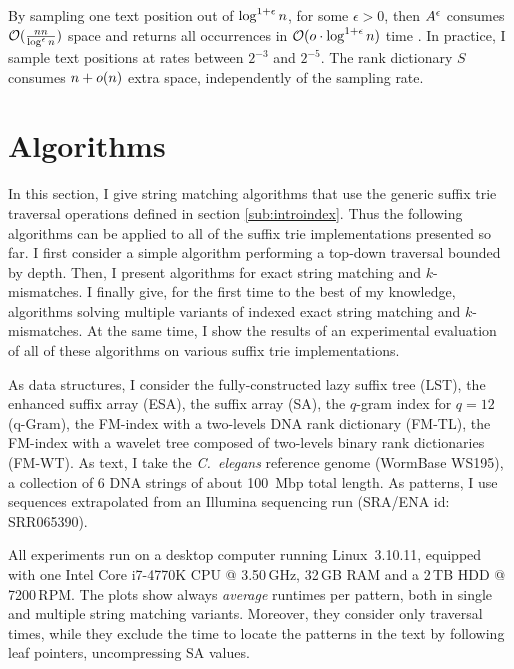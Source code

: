 By sampling one text position out of $\log^{1+\epsilon}{n}$, for some $\epsilon > 0$, then $A^{\epsilon}$ consumes $\mathcal{O}(\frac{n{n}}{\log^{\epsilon}{n}})$ space and  returns all occurrences in $\mathcal{O}(o \cdot \log^{1+\epsilon}{n})$ time \citep{Ferragina2000}.
In practice, I sample text positions at rates between $2^{-3}$ and $2^{-5}$.
The rank dictionary $S$ consumes $n + o(n)$ extra space, independently of the sampling rate.

\section{Algorithms}
\label{sec:index:algo}

In this section, I give string matching algorithms that use the generic suffix trie traversal operations defined in section \ref{sub:introindex}.
Thus the following algorithms can be applied to all of the suffix trie implementations presented so far.
I first consider a simple algorithm performing a top-down traversal bounded by depth.
Then, I present algorithms for exact string matching and $k$-mismatches.%
I finally give, for the first time to the best of my knowledge, algorithms solving multiple variants of indexed exact string matching and $k$-mismatches.
At the same time, I show the results of an experimental evaluation of all of these algorithms on various suffix trie implementations.

As data structures, I consider the fully-constructed lazy suffix tree (LST), the enhanced suffix array (ESA), the suffix array (SA), the $q$-gram index for $q=12$ (q-Gram), the FM-index with a two-levels DNA rank dictionary (FM-TL), the FM-index with a wavelet tree composed of two-levels binary rank dictionaries (FM-WT).
As text, I take the \emph{C.~elegans} reference genome (WormBase WS195), \ie a collection of 6 DNA strings of about 100~Mbp total length.
As patterns, I use sequences extrapolated from an Illumina sequencing run (SRA/ENA id: SRR065390).

All experiments run on a desktop computer running Linux~3.10.11, equipped with one Intel\textsuperscript{\textregistered} Core i7-4770K CPU @ 3.50\,GHz, 32\,GB RAM and a 2\,TB HDD @ 7200\,RPM.
The plots show always \emph{average} runtimes per pattern, both in single and multiple string matching variants.
Moreover, they consider only traversal times, while they exclude the time to locate the patterns in the text by following leaf pointers, \eg uncompressing SA values.

